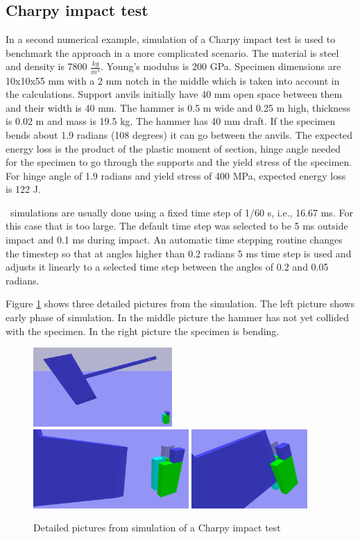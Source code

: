\subsection{Charpy impact test}
In a second numerical example, simulation of a Charpy impact test is
used to benchmark the approach in a more complicated scenario. 
The material is steel and density is 7800 $\frac{kg}{m^{3}}$. Young’s modulus is 200 GPa.
Specimen dimensions are 10x10x55 mm with a 2 mm notch in the middle which is taken into account in the calculations.
Support anvils initially have 40 mm open space between them and their width is 40 mm. 
The hammer is 0.5 m wide and 0.25 m high, thickness is 0.02 m and mass is 19.5 kg.
The hammer has 40 mm draft.
If the specimen bends about 1.9 radians (108 degrees) it can go between the anvils.
The expected energy loss is the product of the plastic moment of section, 
hinge angle needed for the specimen to go through the supports and 
the yield stress of the specimen. For hinge angle of 1.9 radians and yield stress of 400 MPa, expected energy 
loss is 122 J.

\bullet\ simulations are usually done using a fixed time step of 1/60 s, i.e., 16.67 ms. 
For this case that is too large. 
The default time step was selected to be 5 ms outside impact  and 0.1 ms during impact. 
An automatic time stepping routine changes the timestep so that at angles higher than 0.2 radians 5 ms time step is
used and adjusts it linearly to a selected time step between the angles of 0.2 and 0.05 radians.

Figure \ref{fig:charpy-series} shows three detailed pictures from the simulation.
The left picture shows early phase of simulation. 
In the middle picture the hammer has not yet collided with the specimen.
In the right picture the specimen is bending.

\begin{figure}[htb!]
\centering
\includegraphics[height=3cm]{figs/article-charpy-1}
\includegraphics[height=3cm]{figs/article-charpy-2}
\includegraphics[height=3cm]{figs/article-charpy-3}
\caption{Detailed pictures from simulation of a Charpy impact test}
\label{fig:charpy-series}
\end{figure}

